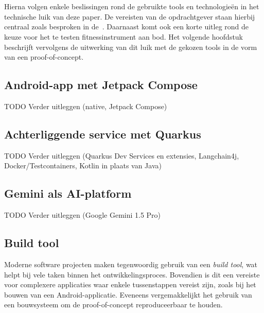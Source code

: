
\chapter{}
\label{ch:shortlist}
Hierna volgen enkele beslissingen rond de gebruikte tools en technologie\"en in het technische luik van deze paper.
De vereisten van de opdrachtgever staan hierbij centraal zoals besproken in de~.
Daarnaast komt ook een korte uitleg rond de keuze voor het te testen fitnessinstrument aan bod.
Het volgende hoofdstuk beschrijft vervolgens de uitwerking van dit luik met de gekozen tools in de vorm van een proof-of-concept.

\section{Android-app met Jetpack Compose}
\label{sec:keuze-framework-voor-android-app}
TODO Verder uitleggen (native, Jetpack Compose)

\section{Achterliggende service met Quarkus}
\label{sec:keuze-framework-voor-back-end}
TODO Verder uitleggen (Quarkus Dev Services en extensies, Langchain4j, Docker/Testcontainers, Kotlin in plaats van Java)

\section{Gemini als AI-platform}
\label{sec:keuze-ai-platform}
TODO Verder uitleggen (Google Gemini 1.5 Pro)

\section{Build tool}
\label{sec:build-tool}
Moderne software projecten maken tegenwoordig gebruik van een \textit{build tool}, wat helpt bij vele taken binnen het ontwikkelingsproces.
Bovendien is dit een vereiste voor complexere applicaties waar enkele tussenstappen vereist zijn, zoals bij het bouwen van een Android-applicatie.
Eveneens vergemakkelijkt het gebruik van een bouwsysteem om de proof-of-concept reproduceerbaar te houden.


